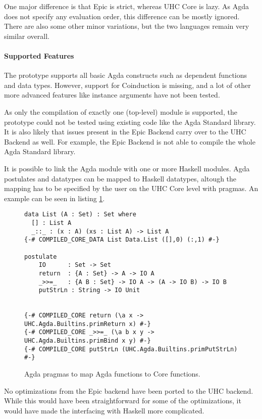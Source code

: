 \documentclass[12pt, a4paper, twoside]{report}
\begin{document}
One major difference is that Epic is strict, whereas UHC Core is lazy. As Agda does not specify
any evaluation order, this difference can be mostly ignored. There are also some other
minor variations, but the two languages remain very similar overall.


\paragraph{Supported Features}
The prototype supports all basic Agda constructs such as dependent functions and data types.
However, support for Coinduction is missing, and a lot of other more advanced features like instance arguments
have not been tested.

As only the compilation of exactly one (top-level) module is supported, the prototype could not
be tested using existing code like the Agda Standard library. It is also likely that issues
present in the Epic Backend carry over to the UHC Backend as well. For example, the Epic
Backend is not able to compile the whole Agda Standard library.

It is possible to link the Agda module with one or more Haskell modules. Agda postulates
and datatypes can be mapped to Haskell datatypes, altough the mapping has to be specified
by the user on the UHC Core level with pragmas. An example can be seen in listing \ref{lst:agda-hs-pragmas}.


\begin{figure}
\begin{lstlisting}
data List (A : Set) : Set where
  [] : List A
  _::_ : (x : A) (xs : List A) -> List A
{-# COMPILED_CORE_DATA List Data.List ([],0) (:,1) #-}

postulate
    IO      : Set -> Set
    return  : {A : Set} -> A -> IO A
    _>>=_   : {A B : Set} -> IO A -> (A -> IO B) -> IO B
    putStrLn : String -> IO Unit


{-# COMPILED_CORE return (\a x -> UHC.Agda.Builtins.primReturn x) #-}
{-# COMPILED_CORE _>>=_ (\a b x y -> UHC.Agda.Builtins.primBind x y) #-}
{-# COMPILED_CORE putStrLn (UHC.Agda.Builtins.primPutStrLn) #-}
\end{lstlisting}
\caption{Agda pragmas to map Agda functions to Core functions.}
\label{lst:agda-hs-pragmas}
\end{figure}

No optimizations from the Epic backend have been ported to the UHC backend. While this
would have been straightforward for some of the optimizations, it would have made the
interfacing with Haskell more complicated.
\end{document}
